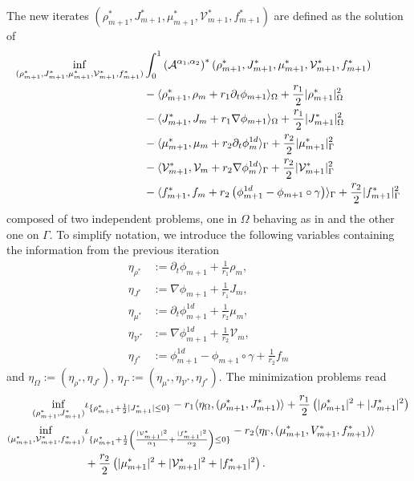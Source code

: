\documentclass{article}
\def\calA{{\mathcal A}} \def\calB{{\mathcal B}} \def\calC{{\mathcal C}}
\DeclarePairedDelimiter{\skp}{\langle}{\rangle}
\begin{document}
\noindent The new iterates $(\rho^*_{m+1}, J^*_{m+1}, \mu^*_{m+1}, \mathcal{V}^*_{m+1}, f^*_{m+1})$ are defined as the solution of
\begin{align*}
    \inf\limits_{(\rho^*_{m+1}, J^*_{m+1}, \mu^*_{m+1}, \mathcal{V}^*_{m+1}, f^*_{m+1})} &\int_0^1 \left(\calA^{\alpha_1, \alpha_2}\right)^*(\rho^*_{m+1}, J^*_{m+1}, \mu^*_{m+1}, \mathcal{V}^*_{m+1}, f^*_{m+1}) \\
    &- \skp{\rho^*_{m+1}, \rho_m + r_1\partial_t\phi_{m+1}}_\Omega + \frac{r_1}{2}|\rho^*_{m+1}|_\Omega^2\\
    &- \skp{J^*_{m+1}, J_m + r_1\nabla\phi_{m+1}}_\Omega + \frac{r_1}{2}|J^*_{m+1}|_\Omega^2\\
    &- \skp{\mu^*_{m+1}, \mu_{m} + r_2\partial_t\phi^{1d}_m}_\Gamma + \frac{r_2}{2} |\mu^*_{m+1}|^2_\Gamma\\
    &- \skp{\mathcal{V}^*_{m+1}, \mathcal{V}_{m} + r_2\nabla\phi^{1d}_m}_\Gamma + \frac{r_2}{2} |\mathcal{V}^*_{m+1}|^2_\Gamma\\
    &- \skp{f^*_{m+1}, f_{m} + r_2\left( \phi^{1d}_{m+1} - \phi_{m+1}\circ\gamma \right)}_\Gamma + \frac{r_2}{2} |f^*_{m+1}|^2_\Gamma
\end{align*}
composed of two independent problems, one in $\Omega$ behaving as in \cite{fu_high_2023} and the other one on $\Gamma$.
To simplify notation, we introduce the following variables containing the information from the previous iteration
\begin{align*}
    \eta_{\rho^*} &:= \partial_t\phi_{m+1} + \frac{1}{r_1}\rho_m,\\
    \eta_{J^*} &:= \nabla\phi_{m+1} + \frac{1}{r_1}J_m,\\
    \eta_{\mu^*} &:= \partial_t\phi^{1d}_{m+1} + \frac{1}{r_2}\mu_m,\\
    \eta_{\mathcal{V}^*} &:= \nabla\phi^{1d}_{m+1} + \frac{1}{r_2}\mathcal{V}_m,\\
    \eta_{f^*} &:= \phi^{1d}_{m+1} - \phi_{m+1}\circ\gamma + \frac{1}{r_2}f_m
\end{align*}
and $\eta_\Omega := (\eta_{\rho^*}, \eta_{J^*})$, $\eta_\Gamma := (\eta_{\mu^*}, \eta_{\mathcal{V}^*}, \eta_{f^*})$.
The minimization problems read
\begin{align*}
    \inf\limits_{(\rho^*_{m+1}, J^*_{m+1})}& \iota_{\{\rho^*_{m+1} + \frac{1}{2}|J^*_{m+1}|\leq 0 \}} - r_1\skp{\eta_\Omega, (\rho^*_{m+1}, J^*_{m+1})} + \frac{r_1}{2}\left( |\rho^*_{m+1}|^2 + |J^*_{m+1}|^2\right)\\
    \inf\limits_{(\mu^*_{m+1}, \mathcal{V}^*_{m+1}, f^*_{m+1})}& \iota_{\{ \mu^*_{m+1} + \frac{1}{2}\left( \frac{|\mathcal{V}^*_{m+1}|^2}{\alpha_1} + \frac{|f^*_{m+1}|^2}{\alpha_2}\right)\leq 0\}} - r_2\skp{\eta_\Gamma, (\mu^*_{m+1}, V^*_{m+1}, f^*_{m+1})} \\
    &+ \frac{r_2}{2}\left( |\mu^*_{m+1}|^2 + |\mathcal{V}^*_{m+1}|^2 +|f^*_{m+1}|^2\right).
\end{align*}
\end{document}

